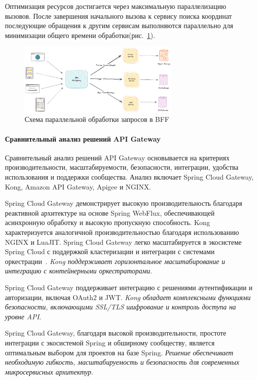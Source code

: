 Оптимизация ресурсов достигается через максимальную параллелизацию вызовов. После завершения начального вызова к сервису поиска координат последующие обращения к другим сервисам выполняются параллельно для минимизации общего времени обработки(рис.~\ref{fig:bff_parallel_processing}).

\begin{figure}[htbp]
    \centering
    \includegraphics[width=0.7\textwidth]{Dissertation/images/bff_par}
    \caption{Схема параллельной обработки запросов в BFF}
    \label{fig:bff_parallel_processing}
\end{figure}

\paragraph{Сравнительный анализ решений API Gateway}

Сравнительный анализ решений API Gateway основывается на критериях производительности, масштабируемости, безопасности, интеграции, удобства использования и поддержки сообщества. Анализ включает Spring Cloud Gateway, Kong, Amazon API Gateway, Apigee и NGINX.

Spring Cloud Gateway демонстрирует высокую производительность благодаря реактивной архитектуре на основе Spring WebFlux, обеспечивающей асинхронную обработку и высокую пропускную способность.
Kong характеризуется аналогичной производительностью благодаря использованию NGINX и LuaJIT. Spring Cloud Gateway легко масштабируется в экосистеме Spring Cloud с поддержкой кластеризации и интеграции с системами оркестрации~\cite{carnell2021spring}. \textit{Kong поддерживает горизонтальное масштабирование и интеграцию с контейнерными оркестраторами}.

Spring Cloud Gateway поддерживает интеграцию с решениями аутентификации и авторизации, включая OAuth2 и JWT. \textit{Kong обладает комплексными функциями безопасности, включающими SSL/TLS шифрование и контроль доступа на уровне API}.

Spring Cloud Gateway, благодаря высокой производительности, простоте интеграции с экосистемой Spring и обширному сообществу, является оптимальным выбором для проектов на базе Spring. \textit{Решение обеспечивает необходимую гибкость, масштабируемость и безопасность для современных микросервисных архитектур}.

